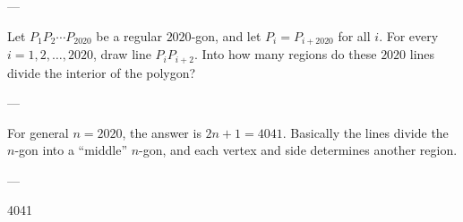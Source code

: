 
---

Let $P_1P_2\cdots P_{2020}$ be a regular $2020$-gon, and let $P_i=P_{i+2020}$ for all $i$. For every $i=1,2,\ldots,2020$, draw line $P_iP_{i+2}$. Into how many regions do these $2020$ lines divide the interior of the polygon?

---

For general $n=2020$, the answer is $2n+1=4041$. Basically the lines divide the $n$-gon into a ``middle'' $n$-gon, and each vertex and side determines another region.

---

4041
